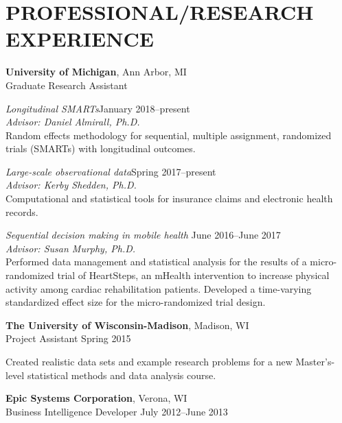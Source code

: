 \documentclass[letterpaper, 11pt]{article}
\begin{document}
\section{PROFESSIONAL/RESEARCH EXPERIENCE}

{\bf University of Michigan}, Ann Arbor, MI\\
Graduate Research Assistant

{\addtolength{\leftskip}{15pt}\textit{Longitudinal SMARTs}\hfill January 2018--present\\
\textit{Advisor: Daniel Almirall, Ph.D.}\\
Random effects methodology for sequential, multiple assignment, randomized trials (SMARTs) with longitudinal outcomes. %

}

{\addtolength{\leftskip}{15pt}\textit{Large-scale observational data}\hfill Spring 2017--present\\
\textit{Advisor: Kerby Shedden, Ph.D.}\\
Computational and statistical tools for insurance claims and electronic health records.

}

{\addtolength{\leftskip}{15pt} \textit{Sequential decision making in mobile health} \hfill June 2016--June 2017\\
\textit{Advisor: Susan Murphy, Ph.D.}\\
Performed data management and statistical analysis for the results of a micro-randomized trial of HeartSteps, an mHealth intervention to increase  physical activity among cardiac rehabilitation patients. Developed a time-varying standardized effect size for the micro-randomized trial design. 

}

{\bf The University of Wisconsin-Madison}, Madison, WI\\
Project Assistant \hfill Spring 2015

{\addtolength{\leftskip}{15pt}
 Created realistic data sets and example research problems for a new Master's-level
  statistical methods and data analysis course.

}

{\bf Epic Systems Corporation}, Verona, WI\\
Business Intelligence Developer \hfill July 2012--June 2013
\end{document}
